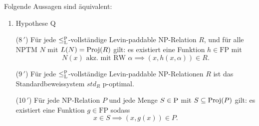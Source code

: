 \begin{theorem}
    Folgende Aussagen sind äquivalent:
    \begin{enumerate}
        \item Hypothese Q
        \item[(8\,$'\!$)] Für jede $\leqlp$-vollständige Levin-paddable NP-Relation $R$, und für alle NPTM $N$ mit $L(N)=\Proj(R)$ gilt: es existiert eine Funktion $h\in\mathrm{FP}$ mit
            \[ N(x) \text{ akz. mit RW $\alpha$} \implies (x,h(x,\alpha))\in R. \]
        \item[(9\,$'\!$)] Für jede $\leqlp$-vollständige Levin-paddable NP-Relationen $R$ ist das Standardbeweissystem $\mathit{std}_R$ p-optimal.
        \item[(10\,$'\!$)] Für jede NP-Relation $P$ und jede Menge $S\in \P$ mit $S\subseteq \Proj(P)$ gilt: es existiert eine Funktion $g\in\mathrm{FP}$ sodass
            \[ x\in S \implies (x, g(x))\in P. \]
    \end{enumerate}
\end{theorem}

